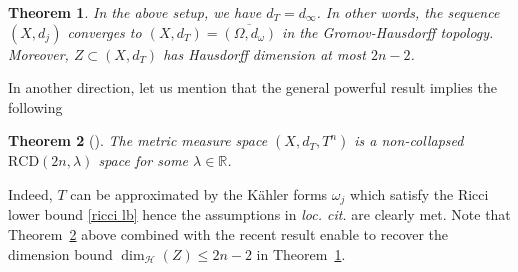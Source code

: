 \documentclass[a4paper,11pt,leqno,english]{smfart}
\theoremstyle{plain}
\newtheorem{thm}{Theorem}[section]
\theoremstyle{plain}
\numberwithin{equation}{section} %
\numberwithin{figure}{section} %
\theoremstyle{plain}
\theoremstyle{plain}
\theoremstyle{remark}
\theoremstyle{remark}
\theoremstyle{definition}
\theoremstyle{plain}
\theoremstyle{plain}
\theoremstyle{definition}
\renewcommand{\le}{\leq}
\begin{document}
\begin{thm}
\label{thm metric completion}
In the above setup, we have $d_T=d_\infty$. In other words, the sequence $(X,d_j)$ converges to $(X,d_T)=\overline{(\Omega, d_\omega)} $ in the Gromov-Hausdorff topology. Moreover, $Z\subset (X,d_T)$ has Hausdorff dimension at most $2n-2$. 
\end{thm}

 

In another direction, let us mention that the general powerful result \cite[Theorem~5.1]{G+} implies the following
\begin{thm}[\cite{G+}]
The metric measure space $(X,d_T,T^n)$ is a non-collapsed $\mathrm{RCD}(2n,\lambda)$ space for some $\lambda \in \mathbb R$. 
\label{RCD}
\end{thm}

Indeed, $T$ can be approximated by the Kähler forms $\omega_j$ which satisfy the Ricci lower bound \eqref{ricci lb} hence the assumptions in {\it loc. cit.} are clearly met. Note that Theorem~\ref{RCD} above combined with the recent result \cite[Theorem~3]{Sz25} enable to recover the dimension bound $\dim_{\mathcal H}(Z)\le 2n-2$ in Theorem~\ref{thm metric completion}.
\end{document}
